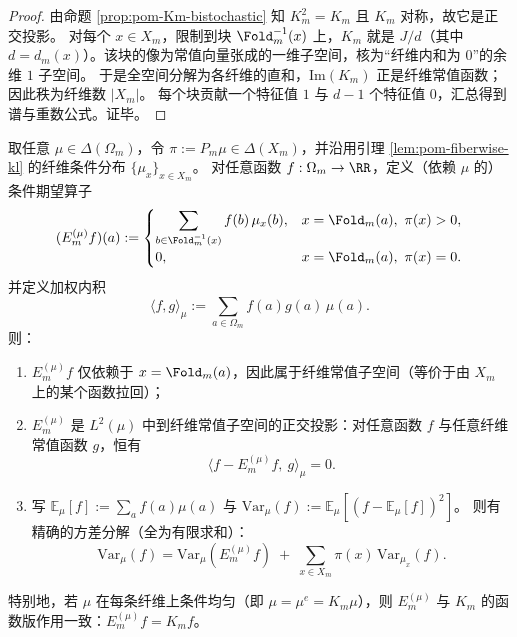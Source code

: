 \begin{proof}
由命题 \ref{prop:pom-Km-bistochastic} 知 $K_m^2=K_m$ 且 $K_m$ 对称，故它是正交投影。
对每个 $x\in X_m$，限制到块 $\Fold_m^{-1}(x)$ 上，$K_m$ 就是 $J/d$（其中 $d=d_m(x)$）。该块的像为常值向量张成的一维子空间，核为“纤维内和为 $0$”的余维 $1$ 子空间。
于是全空间分解为各纤维的直和，$\mathrm{Im}(K_m)$ 正是纤维常值函数；因此秩为纤维数 $|X_m|$。
每个块贡献一个特征值 $1$ 与 $d-1$ 个特征值 $0$，汇总得到谱与重数公式。证毕。
\end{proof}

\begin{proposition}\label{prop:pom-weighted-condexp-variance}
取任意 $\mu\in\Delta(\Omega_m)$，令 $\pi:=P_m\mu\in\Delta(X_m)$，并沿用引理 \ref{lem:pom-fiberwise-kl} 的纤维条件分布 $\{\mu_x\}_{x\in X_m}$。
对任意函数 $f:\Omega_m\to\RR$，定义（依赖 $\mu$ 的）条件期望算子
\[
(E_{m}^{(\mu)}f)(a):=
\begin{cases}
\displaystyle \sum_{b\in \Fold_m^{-1}(x)} f(b)\,\mu_x(b),& x=\Fold_m(a),\ \pi(x)>0,\\[6pt]
0,& x=\Fold_m(a),\ \pi(x)=0.
\end{cases}
\]
并定义加权内积
\[
\langle f,g\rangle_\mu:=\sum_{a\in\Omega_m} f(a)g(a)\,\mu(a).
\]
则：
\begin{enumerate}
  \item $E_m^{(\mu)}f$ 仅依赖于 $x=\Fold_m(a)$，因此属于纤维常值子空间（等价于由 $X_m$ 上的某个函数拉回）；
  \item $E_m^{(\mu)}$ 是 $L^2(\mu)$ 中到纤维常值子空间的正交投影：对任意函数 $f$ 与任意纤维常值函数 $g$，恒有
  \[
  \boxed{\;\langle f-E_m^{(\mu)}f,\ g\rangle_\mu=0.\;}
  \]
  \item 写
  \(
  \mathbb{E}_\mu[f]:=\sum_a f(a)\mu(a)
  \)
  与
  \(
  \mathrm{Var}_\mu(f):=\mathbb{E}_\mu[(f-\mathbb{E}_\mu[f])^2]
  \)。
  则有精确的方差分解（全为有限求和）：
  \[
  \boxed{\;
  \mathrm{Var}_\mu(f)=\mathrm{Var}_\mu(E_m^{(\mu)}f)\;+\;\sum_{x\in X_m}\pi(x)\,\mathrm{Var}_{\mu_x}(f).
  \;}
  \]
\end{enumerate}
特别地，若 $\mu$ 在每条纤维上条件均匀（即 $\mu=\mu^e=K_m\mu$），则 $E_m^{(\mu)}$ 与 $K_m$ 的函数版作用一致：$E_m^{(\mu)}f=K_m f$。
\end{proposition}
